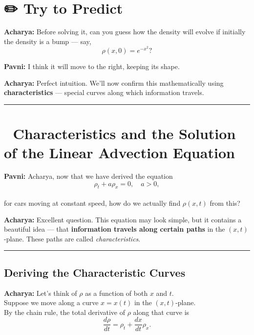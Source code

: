 \documentclass[
  letterpaper,
]{book}
\begin{document}
\section{✏️ Try to Predict}\label{try-to-predict}

\textbf{Acharya:} Before solving it, can you guess how the density will
evolve if initially the density is a bump --- say, \[
\rho(x,0) = e^{-x^2}?
\]

\textbf{Pavni:} I think it will move to the right, keeping its shape.

\textbf{Acharya:} Perfect intuition. We'll now confirm this
mathematically using \textbf{characteristics} --- special curves along
which information travels.

\begin{center}\rule{0.5\linewidth}{0.5pt}\end{center}

\section{🌊 Characteristics and the Solution of the Linear Advection
Equation}\label{characteristics-and-the-solution-of-the-linear-advection-equation}

\textbf{Pavni:} Acharya, now that we have derived the equation\\
\[
\rho_t + a\rho_x = 0, \quad a > 0,
\]\\
for cars moving at constant speed, how do we actually find \(\rho(x,t)\)
from this?

\textbf{Acharya:} Excellent question. This equation may look simple, but
it contains a beautiful idea --- that \textbf{information travels along
certain paths} in the \((x,t)\)-plane. These paths are called
\emph{characteristics}.

\begin{center}\rule{0.5\linewidth}{0.5pt}\end{center}

\subsection{Deriving the Characteristic
Curves}\label{deriving-the-characteristic-curves}

\textbf{Acharya:} Let's think of \(\rho\) as a function of both \(x\)
and \(t\).\\
Suppose we move along a curve \(x = x(t)\) in the \((x,t)\)-plane.\\
By the chain rule, the total derivative of \(\rho\) along that curve is
\[
\frac{d\rho}{dt} = \rho_t + \frac{dx}{dt}\rho_x.
\]
\end{document}

